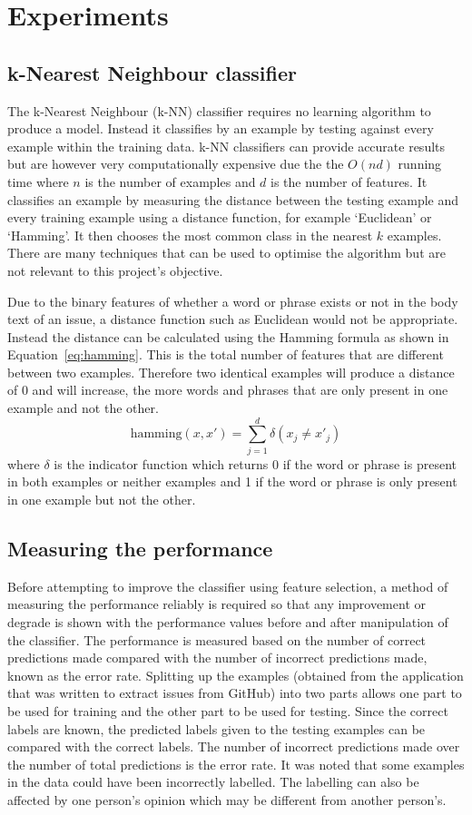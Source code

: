 \section{Experiments}
\subsection{k-Nearest Neighbour classifier}
The k-Nearest Neighbour (k-NN) classifier requires no learning algorithm to produce a model. Instead it classifies by an example
by testing against every example within the training data. k-NN classifiers can provide accurate results but are however very
computationally expensive due the the $O(nd)$ running time where $n$ is the number of examples and $d$ is the number of
features. It classifies an example by measuring the distance between the testing example and every training example using a
distance function, for example `Euclidean' or `Hamming'. It then chooses the most common class in the nearest $k$ examples.
There are many techniques that can be used to optimise the algorithm but are not relevant to this project's objective.

Due to the binary features of whether a word or phrase exists or not in the body text of an issue, a distance function such as
Euclidean would not be appropriate. Instead the distance can be calculated using the Hamming formula as shown in
Equation~\ref{eq:hamming}. This is the total number of features that are different between two examples. Therefore two identical
examples will produce a distance of 0 and will increase, the more words and phrases that are only present in one example and not
the other.
\begin{equation}
    \label{eq:hamming}
    \mathrm{hamming}(x,x') = \sum^d_{j=1} \delta (x_{j} \neq x'_{j})
\end{equation}
where $\delta$ is the indicator function which returns 0 if the word or phrase is present in both examples or neither examples
and 1 if the word or phrase is only present in one example but not the other.

\subsection{Measuring the performance}
Before attempting to improve the classifier using feature selection, a method of measuring the performance reliably is required
so that any improvement or degrade is shown with the performance values before and after manipulation of the classifier. The
performance is measured based on the number of correct predictions made compared with the number of incorrect predictions made,
known as the error rate. Splitting up the examples (obtained from the application that was written to extract issues from
GitHub) into two parts allows one part to be used for training and the other part to be used for testing. Since the correct
labels are known, the predicted labels given to the testing examples can be compared with the correct labels. The number of
incorrect predictions made over the number of total predictions is the error rate. It was noted that some examples in the data
could have been incorrectly labelled. The labelling can also be affected by one person's opinion which may be different from
another person's.


